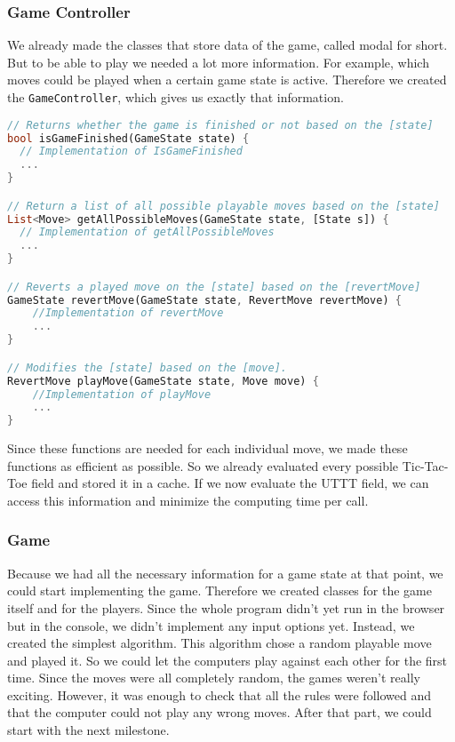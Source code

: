 \subsubsection{Game Controller}
We already made the classes that store data of the game, called modal for short. But to be able to play we needed a lot more information. For example, which moves could be played when a certain game state is active. Therefore we created the \texttt{GameController}, which gives us exactly that information.
\begin{lstlisting}[language=Dart,caption={Structure of the \texttt{GameController}}]
// Returns whether the game is finished or not based on the [state]
bool isGameFinished(GameState state) {
  // Implementation of IsGameFinished
  ...
}

// Return a list of all possible playable moves based on the [state]
List<Move> getAllPossibleMoves(GameState state, [State s]) {
  // Implementation of getAllPossibleMoves
  ...
}

// Reverts a played move on the [state] based on the [revertMove]
GameState revertMove(GameState state, RevertMove revertMove) {
	//Implementation of revertMove
	...
}

// Modifies the [state] based on the [move].
RevertMove playMove(GameState state, Move move) {
	//Implementation of playMove
	...
}
\end{lstlisting}
Since these functions are needed for each individual move, we made these functions as efficient as possible. So we already evaluated every possible Tic-Tac-Toe field and stored it in a cache. If we now evaluate the \ac{UTTT} field, we can access this information and minimize the computing time per call.

\subsubsection{Game}
Because we had all the necessary information for a game state at that point, we could start implementing the game. Therefore we created classes for the game itself and for the players. Since the whole program didn't yet run in the browser but in the console, we didn't implement any input options yet. Instead, we created the simplest algorithm. This algorithm chose a random playable move and played it. So we could let the computers play against each other for the first time. Since the moves were all completely random, the games weren't really exciting. However, it was enough to check that all the rules were followed and that the computer could not play any wrong moves. After that part, we could start with the next milestone.

